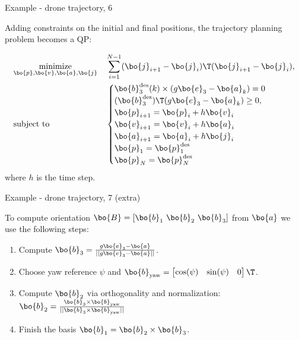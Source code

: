 \begin{frame}{Example - drone trajectory, 6}
	\begin{flushleft}
		
		Adding constraints on the initial and final positions, the trajectory planning problem becomes a QP:
		
		\begin{equation}
			\begin{aligned}
				& \underset{\bo{p},\bo{v},\bo{a},\bo{j}}{\text{minimize}}
				& &\sum_{i = 1}^{N-1} ( \bo{j}_{i+1} - \bo{j}_i)\T ( \bo{j}_{i+1} - \bo{j}_i), \\
				& \text{subject to}
				& & \begin{cases}
					\bo{b}_3^\text{des}(k) \times (g \bo{e}_3 - \bo{a}_k) = 0
					\\
					(\bo{b}_3^\text{des} )\T (g \bo{e}_3 - \bo{a}_k) \geq 0,
					\\
					\bo{p}_{i+1} = \bo{p}_i + h \bo{v}_i \\
					\bo{v}_{i+1} = \bo{v}_i + h \bo{a}_i \\
					\bo{a}_{i+1} = \bo{a}_i + h \bo{j}_i 
					\\
					\bo{p}_1 = \bo{p}_1^\text{des}
					\\
					\bo{p}_N = \bo{p}_N^\text{des}
				\end{cases}
			\end{aligned}
		\end{equation}
		where $h$ is the time step.
		
	\end{flushleft}
\end{frame}



\begin{frame}{Example - drone trajectory, 7 (extra)}
	\begin{flushleft}
		
		
		To compute orientation $\bo{B} = [\bo{b}_1 \ \bo{b}_2 \ \bo{b}_3]$ from $\bo{a}$ we use the following steps:
		
		\begin{enumerate}
			
			\item Compute $\bo{b}_3 =  \frac{g \bo{e}_3 - \bo{a}}{||g \bo{e}_3 - \bo{a}||}$.
			
			\item Choose yaw reference $\psi$ and $\bo{b}_\text{yaw} = \begin{bmatrix}
			\cos (\psi) & \sin(\psi) & 0
			\end{bmatrix}\T$.
			
			\item Compute $\bo{b}_2$ via orthogonality and normalization: $\bo{b}_2 = \frac{\bo{b}_3 \times \bo{b}_\text{yaw}}{||\bo{b}_3 \times \bo{b}_\text{yaw}||}$
			
			\item Finish the basis $\bo{b}_1 =  \bo{b}_2 \times \bo{b}_3$.
		\end{enumerate}
		
	\end{flushleft}
\end{frame}



